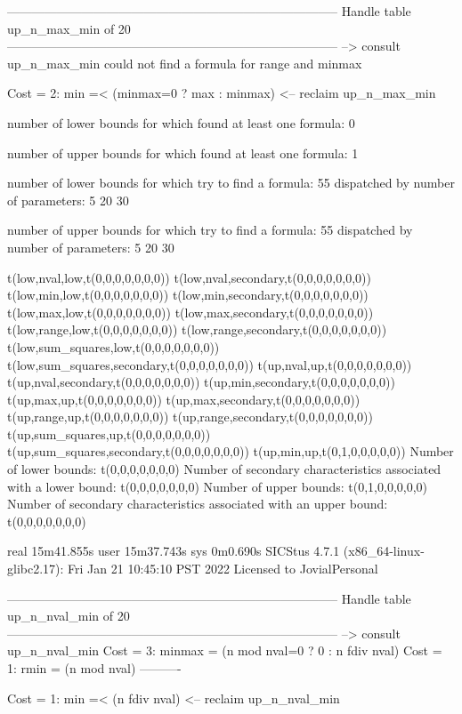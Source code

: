 --------------------------------------------------------------------------------
Handle table up_n_max_min of 20
--------------------------------------------------------------------------------
--> consult up_n_max_min
could not find a formula for range and minmax

Cost =  2:  min =< (minmax=0 ? max : minmax)
<-- reclaim up_n_max_min

number of lower bounds for which found at least one formula: 0

number of upper bounds for which found at least one formula: 1

number of lower bounds for which try to find a formula: 55
dispatched by number of parameters: 5  20  30

number of upper bounds for which try to find a formula: 55
dispatched by number of parameters: 5  20  30

t(low,nval,low,t(0,0,0,0,0,0,0))
t(low,nval,secondary,t(0,0,0,0,0,0,0))
t(low,min,low,t(0,0,0,0,0,0,0))
t(low,min,secondary,t(0,0,0,0,0,0,0))
t(low,max,low,t(0,0,0,0,0,0,0))
t(low,max,secondary,t(0,0,0,0,0,0,0))
t(low,range,low,t(0,0,0,0,0,0,0))
t(low,range,secondary,t(0,0,0,0,0,0,0))
t(low,sum_squares,low,t(0,0,0,0,0,0,0))
t(low,sum_squares,secondary,t(0,0,0,0,0,0,0))
t(up,nval,up,t(0,0,0,0,0,0,0))
t(up,nval,secondary,t(0,0,0,0,0,0,0))
t(up,min,secondary,t(0,0,0,0,0,0,0))
t(up,max,up,t(0,0,0,0,0,0,0))
t(up,max,secondary,t(0,0,0,0,0,0,0))
t(up,range,up,t(0,0,0,0,0,0,0))
t(up,range,secondary,t(0,0,0,0,0,0,0))
t(up,sum_squares,up,t(0,0,0,0,0,0,0))
t(up,sum_squares,secondary,t(0,0,0,0,0,0,0))
t(up,min,up,t(0,1,0,0,0,0,0))
Number of lower bounds:                                             t(0,0,0,0,0,0,0)
Number of secondary characteristics associated with a lower bound:  t(0,0,0,0,0,0,0)
Number of upper bounds:                                             t(0,1,0,0,0,0,0)
Number of secondary characteristics associated with an upper bound: t(0,0,0,0,0,0,0)

real	15m41.855s
user	15m37.743s
sys	0m0.690s
SICStus 4.7.1 (x86_64-linux-glibc2.17): Fri Jan 21 10:45:10 PST 2022
Licensed to JovialPersonal


--------------------------------------------------------------------------------
Handle table up_n_nval_min of 20
--------------------------------------------------------------------------------
--> consult up_n_nval_min
Cost =  3:  minmax = (n mod nval=0 ? 0 : n fdiv nval)
Cost =  1:  rmin   = (n mod nval)
----------

Cost =  1:  min =< (n fdiv nval)
<-- reclaim up_n_nval_min


